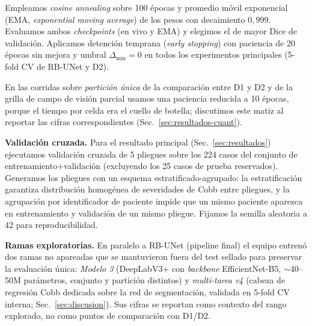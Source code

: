 \documentclass[conference]{IEEEtran}
\begin{document}
Empleamos \emph{cosine annealing} sobre 100 épocas y promedio móvil exponencial (EMA, \emph{exponential moving average}) de los pesos con decaimiento $0{,}999$. Evaluamos ambos \emph{checkpoints} (en vivo y EMA) y elegimos el de mayor Dice de validación. Aplicamos detención temprana (\emph{early stopping}) con paciencia de 20 épocas sin mejora y umbral $\Delta_{\min} = 0$ en todos los experimentos principales (5-fold CV de RB-UNet y D2).

En las corridas sobre \emph{partición única} de la comparación entre D1 y D2 y de la grilla de campo de visión parcial usamos una paciencia reducida a 10 épocas, porque el tiempo por celda era el cuello de botella; discutimos este matiz al reportar las cifras correspondientes (Sec.~\ref{sec:resultados-cuant}).

\textbf{Validación cruzada.} Para el resultado principal (Sec.~\ref{sec:resultados}) ejecutamos validación cruzada de 5 pliegues sobre los 224 casos del conjunto de entrenamiento+validación (excluyendo los 25 casos de prueba reservados). Generamos los pliegues con un esquema estratificado-agrupado: la estratificación garantiza distribución homogénea de severidades de Cobb entre pliegues, y la agrupación por identificador de paciente impide que un mismo paciente aparezca en entrenamiento y validación de un mismo pliegue. Fijamos la semilla aleatoria a $42$ para reproducibilidad.

\textbf{Ramas exploratorias.} En paralelo a RB-UNet (pipeline final) el equipo entrenó dos ramas no apareadas que se mantuvieron fuera del test sellado para preservar la evaluación única: \emph{Modelo 3} (DeepLabV3+ con \emph{backbone} EfficientNet-B5, $\sim$40--50M parámetros, conjunto y partición distintos) y \emph{multi-tarea v4} (cabeza de regresión Cobb dedicada sobre la red de segmentación, validada en 5-fold CV interna; Sec.~\ref{sec:discusion}). Sus cifras se reportan como contexto del rango explorado, no como puntos de comparación con D1/D2.
\end{document}
